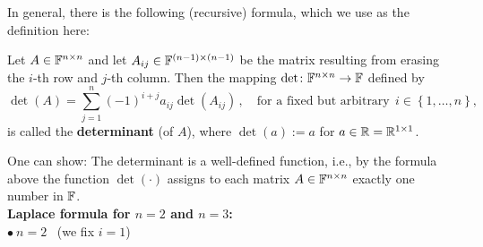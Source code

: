 \begin{frame}
In general, there is the following (recursive) formula, which we use as the definition here: \vspace{-0.2cm}
\begin{definition}\label{def:Laplace-formula} Let
$A \in {\mathbb{F}}^{n\times n} $ 
and let
$ A_{ij} \in {\mathbb{F}}^{(n-1) \times (n-1)} $ be
the matrix resulting from erasing the $i$-th row and $j$-th column. Then the mapping $\det\colon {\mathbb{F}}^{n\times n} \to {\mathbb{F}} $ defined by
%
\[
\det(A) = \sum^n_{j=1}(-1)^{i + j} a_{ij} \det(A_{ij})\, ,\quad \text{for a fixed but arbitrary} ~~i \in \left\{1, \ldots, n \right\},
\]
is called the \textbf{determinant} (of $A$), where $\det(a) := a$ for $a\in{\mathbb{R}} = {\mathbb{R}}^{1\times 1}$.
\end{definition}
{\color{satzrot} One can show: The determinant is a well-defined function, i.e., by the formula above the function $\det(\cdot)$ assigns to each matrix $A \in {\mathbb{F}}^{n\times n}$ exactly one number in ${\mathbb{F}}$.}\\
\vspace{0.5cm}
\textbf{Laplace formula for $n=2$ and $n=3$:}\\\vspace{0.2cm}
$\bullet~ n=2$ ~{\small (we fix $i=1$)}  \\ \vspace{0.2cm}
\end{frame}
